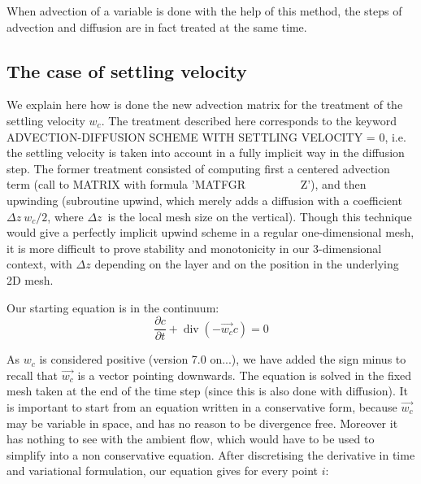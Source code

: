 When advection of a variable is done with the help of this method, the steps
of advection and diffusion are in fact treated at the same time.

\subsection{The case of settling velocity}

We explain here how is done the new advection matrix for the treatment of the
settling velocity $w_{c}$. The treatment described here corresponds to the
keyword ADVECTION-DIFFUSION SCHEME WITH SETTLING VELOCITY = 0, i.e. the
settling velocity is taken into account in a fully implicit way in the
diffusion step. The former treatment consisted of computing first a centered
advection term (call to MATRIX with formula 'MATFGR \ \ \ \ \ \ \ \ \ Z'), and
then upwinding (subroutine upwind, which merely adds a diffusion with a
coefficient $\Delta z~w_{c}/2$, where $\Delta z$\ is the local mesh
size on the vertical). Though this technique would give a perfectly implicit
upwind scheme in a regular one-dimensional mesh, it is more difficult to prove
stability and monotonicity in our 3-dimensional context, with $\Delta z $
depending on the layer and on the position in the underlying 2D mesh.

Our starting equation is in the continuum:%
\begin{equation}
\dfrac{\partial c}{\partial t}+\operatorname{div}(-\vec{w_{c}}c)=0
\end{equation}


As $w_{c}$ is considered positive (version 7.0 on...), we have added the sign
minus to recall that $\vec{w_{c}}$ is a vector pointing downwards.
The equation is solved in the fixed mesh taken at the end of the time step
(since this is also done with diffusion). It is important to start from an
equation written in a conservative form, because $\vec{w_{c}}$ may
be variable in space, and has no reason to be divergence free. Moreover it has
nothing to see with the ambient flow, which would have to be used to simplify
into a non conservative equation.
After discretising the derivative in time and variational formulation, our
equation gives for every point $i$:%

